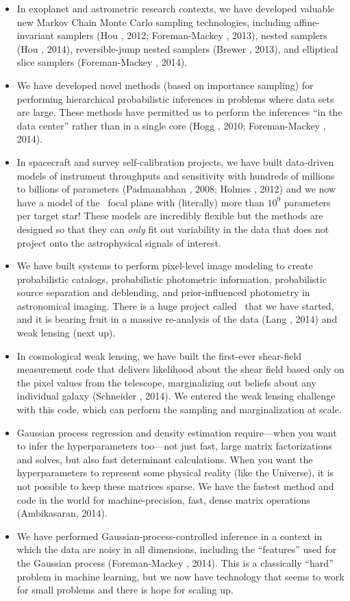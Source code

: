 \documentclass[12pt]{article}
\begin{document}
\begin{itemize}
\item
In exoplanet and astrometric research contexts, we have developed valuable new Markov
Chain Monte Carlo sampling technologies, including affine-invariant
samplers (Hou \etal, 2012; Foreman-Mackey \etal, 2013), nested
samplers (Hou \etal, 2014), reversible-jump nested samplers (Brewer
\etal, 2013), and elliptical slice samplers (Foreman-Mackey \etal,
2014).
\item
We have developed novel methods (based on importance sampling) for
performing hierarchical probabilistic inferences in problems where
data sets are large.  These methods have permitted us to perform the
inferences ``in the data center'' rather than in a single core (Hogg
\etal, 2010; Foreman-Mackey \etal, 2014).
\item
In spacecraft and survey self-calibration projects, we have built
data-driven models of instrument throughputs and sensitivity with
hundreds of millions to billions of parameters (Padmanabhan \etal,
2008; Holmes \etal, 2012) and we now have a model of the
\kepler\ focal plane with (literally) more than $10^9$ parameters per
target star!  These models are incredibly flexible but the methods are
designed so that they can \emph{only} fit out variability in the data
that does not project onto the astrophysical signals of interest.
\item
We have built systems to perform pixel-level image modeling to create
probabilistic catalogs, probabilistic photometric information,
probabilistic source separation and deblending, and prior-influenced
photometry in astronomical imaging.  There is a huge project called
\thetractor\ that we have started, and it is bearing fruit in a
massive re-analysis of the  data (Lang \etal, 2014) and weak
lensing (next up).
\item
In cosmological weak lensing, we have built the first-ever shear-field
measurement code that delivers likelihood about the shear field based
only on the pixel values from the telescope, marginalizing out beliefs
about any individual galaxy (Schneider \etal, 2014).  We entered the
 weak lensing challenge with this code, which can
perform the sampling and marginalization at scale.
\item
Gaussian process regression and density estimation require---when you
want to infer the hyperparameters too---not just fast, large matrix
factorizations and solves, but also fast determinant calculations.
When you want the hyperparameters to represent some physical reality
(like the Universe), it is not possible to keep these matrices sparse.
We have the fastest method and code in the world for
machine-precision, fast, dense matrix operations (Ambikasaran, 2014).
\item
We have performed Gaussian-process-controlled inference in a context
in which the data are noisy in all dimensions, including the
``features'' used for the Gaussian process (Foreman-Mackey \etal,
2014).  This is a classically ``hard'' problem in machine learning,
but we now have technology that seems to work for small problems and
there is hope for scaling up.
\end{itemize}
\end{document}
